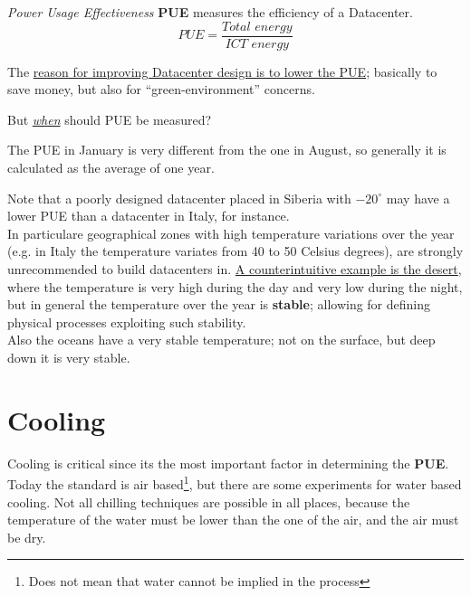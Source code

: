 
\begin{definition}[PUE]
\textit{Power Usage Effectiveness} \textbf{PUE} measures the efficiency of a Datacenter.
\[PUE = \frac{
   \textit{Total energy}
}{\textit{ICT energy}}\]
\end{definition}
The \ul{reason for improving Datacenter design is to lower the PUE};
basically to save money, but also for ``green-environment'' concerns.

\begin{center}
   But \textit{\ul{when}} should PUE be measured?
\end{center}
The PUE in January is very different from the one in August, so generally it is calculated as the average of one year.

Note that a poorly designed datacenter placed in Siberia with $-20^{\circ}$ may have a lower PUE than a datacenter in Italy, for instance.\\
In particulare geographical zones with high temperature variations over the year (e.g. in Italy the temperature variates from 40 to 50 Celsius degrees), are strongly unrecommended to build datacenters in.
\ul{A counterintuitive example is the desert}, where the temperature is very high during the day and very low during the night, but in general the temperature over the year is \textbf{stable}; allowing for defining physical processes exploiting such stability.\\
Also the oceans have a very stable temperature; not on the surface, but deep down it is very stable.

\section{Cooling}
Cooling is critical since its the most important factor in determining the \textbf{PUE}. Today the standard is air based\footnote{Does not mean that water cannot be implied in the process}, but there are some experiments for water based cooling.
Not all chilling techniques are possible in all places, because the temperature of the water must be lower than the one of the air, and the air must be dry.

